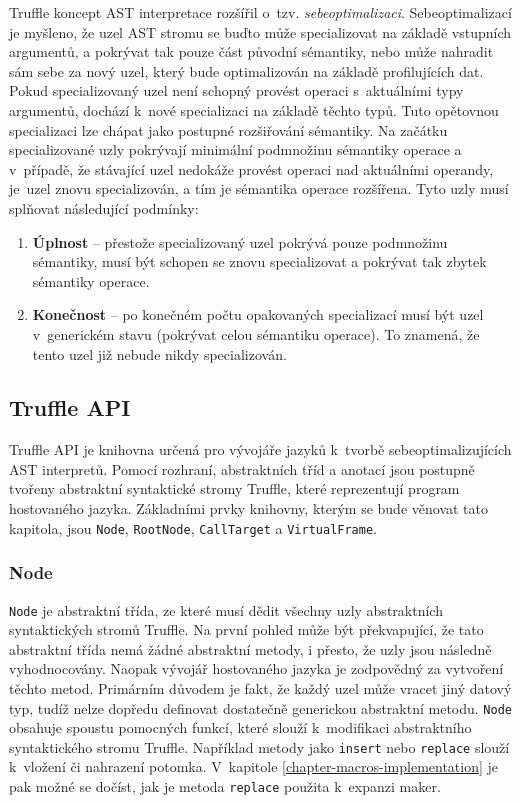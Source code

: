 \documentclass[
  master,
  biblatex,
  figures=true,
  theorems,
  sourcecodes,
  glossaries,
  index
]{kidiplom}
\begin{document}
Truffle koncept AST interpretace rozšířil o~tzv. \textit{sebeoptimalizaci}. Sebeoptimalizací je myšleno, že uzel AST stromu se buďto může specializovat na základě vstupních argumentů, a pokrývat tak pouze část původní sémantiky, nebo může nahradit sám sebe za nový uzel, který bude optimalizován na základě profilujících dat. Pokud specializovaný uzel není schopný provést operaci s~aktuálními typy argumentů, dochází k~nové specializaci na základě těchto typů. Tuto opětovnou specializaci lze chápat jako postupné rozšiřování sémantiky. Na začátku specializované uzly pokrývají minimální podmnožinu sémantiky operace a v~případě, že stávající uzel nedokáže provést operaci nad aktuálními operandy, je~uzel znovu specializován, a tím je sémantika operace rozšířena. Tyto uzly musí splňovat následující podmínky:

\begin{enumerate}
    \item \textbf{Úplnost} -- přestože specializovaný uzel pokrývá pouze podmnožinu sémantiky, musí být schopen se znovu specializovat a pokrývat tak zbytek sémantiky operace.  
    \item \textbf{Konečnost} -- po konečném počtu opakovaných specializací musí být uzel v~generickém stavu (pokrývat celou sémantiku operace). To znamená, že tento uzel již nebude nikdy specializován. 
\end{enumerate}


\subsection{Truffle API}
Truffle API je knihovna určená pro vývojáře jazyků k~tvorbě sebeoptimalizujících AST interpretů. Pomocí rozhraní, abstraktních tříd a anotací jsou postupně tvořeny abstraktní syntaktické stromy Truffle, které reprezentují program hostovaného jazyka. Základními prvky knihovny, kterým se bude věnovat tato kapitola, jsou \texttt{Node}, \texttt{RootNode}, \texttt{CallTarget} a \texttt{VirtualFrame}.

\subsubsection{Node}
\texttt{Node} je abstraktní třída, ze které musí dědit všechny uzly abstraktních syntaktických stromů Truffle. Na první pohled může být překvapující, že tato abstraktní třída nemá žádné abstraktní metody, i přesto, že uzly jsou následně vyhodnocovány. Naopak vývojář hostovaného jazyka je zodpovědný za vytvoření těchto metod. Primárním důvodem je fakt, že každý uzel může vracet jiný datový typ, tudíž nelze dopředu definovat dostatečně generickou abstraktní metodu. \texttt{Node} obsahuje spoustu pomocných funkcí, které slouží k~modifikaci abstraktního syntaktického stromu Truffle. Například metody jako \texttt{insert} nebo \texttt{replace} slouží k~vložení či nahrazení potomka. V~kapitole \ref{chapter-macros-implementation} je pak možné se dočíst, jak je metoda \texttt{replace} použita k~expanzi maker. 
\end{document}
